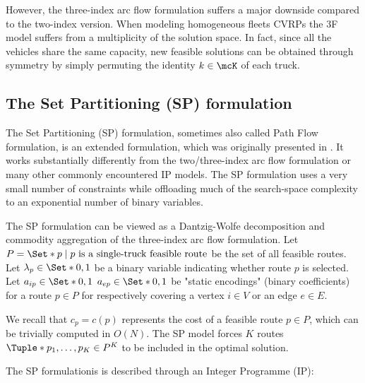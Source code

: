 However, the three-index arc flow formulation suffers a major downside compared to the two-index version.
When modeling homogeneous fleets CVRPs the 3F model suffers from a multiplicity of the solution space.
In fact, since all the vehicles share the same capacity,
new feasible solutions can be obtained through symmetry by simply permuting the identity $k \in \mcK$ of each truck.


\subsection{The Set Partitioning (SP) formulation}
\label{sec:intro-set-partition-formulation}

The Set Partitioning (SP) formulation, sometimes also called Path Flow formulation, is an extended formulation, which was originally presented in \textcite{balinski1964}.
It works substantially differently from the two/three-index arc flow formulation or many other commonly encountered IP models.
The SP formulation uses a very small number of constraints while offloading much of the search-space complexity to an exponential number of binary variables.


The SP formulation can be viewed as a Dantzig-Wolfe decomposition \parencite{dantzig1960}
and commodity aggregation \parencite{desaulniers1998}
of the three-index arc flow formulation.
Let $P = \Set*{p \mid p\ \text{is a single-truck feasible route}}$ be the set of all feasible routes.
Let $\lambda_p \in \Set*{0, 1}$ be a binary variable indicating whether route $p$ is selected.
Let $a_{ip} \in \Set*{0, 1}$ $a_{ep} \in \Set*{0, 1}$ be "static encodings" (binary coefficients)
for a route $p \in P$ for respectively covering a vertex $i \in V$ or an edge $e \in E$.

We recall that $c_p = c(p)$ represents the cost of a feasible route $p \in P$, which can be trivially computed in $O(N)$.
The SP model forces $K$ routes $\Tuple*{p_1, \dots, p_K} \in P^K$ to be included in the optimal solution.

The SP formulationis is described through an Integer Programme (IP):


